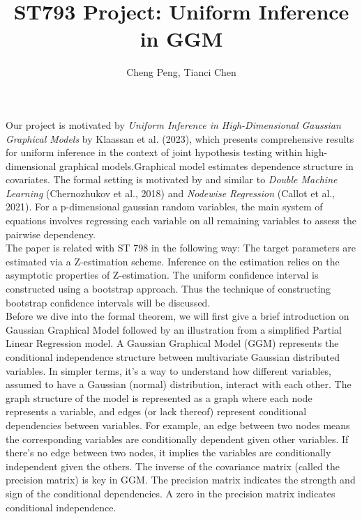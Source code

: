 \documentclass{article}
\author{Cheng Peng, Tianci Chen}
\title{ST793 Project: Uniform Inference in GGM}
\begin{document}
\maketitle

Our project is motivated by \textit{Uniform Inference in High-Dimensional Gaussian Graphical Models} by Klaassan et al. (2023), which presents comprehensive results for uniform inference in the context of joint hypothesis testing within high-dimensional graphical models.Graphical model estimates dependence structure in covariates. The formal setting is motivated by and similar to \textit{Double Machine Learning} (Chernozhukov et al., 2018) and \textit{Nodewise Regression} (Callot et al., 2021). For a p-dimensional gaussian random variables, the main system of equations involves regressing each variable on all remaining variables to assess the pairwise dependency. \\

\noindent The paper is related with ST 798 in the following way: The target parameters are estimated via a Z-estimation scheme. Inference on the estimation relies on the asymptotic properties of Z-estimation. The uniform confidence interval is constructed using a bootstrap approach. Thus the technique of constructing bootstrap confidence intervals will be discussed.\\

\noindent Before we dive into the formal theorem, we will first give a brief introduction on Gaussian Graphical Model followed by an illustration from a simplified Partial Linear Regression model. A Gaussian Graphical Model (GGM) represents the conditional independence structure between multivariate Gaussian distributed variables. In simpler terms, it's a way to understand how different variables, assumed to have a Gaussian (normal) distribution, interact with each other. The graph structure of the model is represented as a graph where each node represents a variable, and edges (or lack thereof) represent conditional dependencies between variables. For example, an edge between two nodes means the corresponding variables are conditionally dependent given other variables. If there's no edge between two nodes, it implies the variables are conditionally independent given the others. The inverse of the covariance matrix (called the precision matrix) is key in GGM. The precision matrix indicates the strength and sign of the conditional dependencies. A zero in the precision matrix indicates conditional independence.\\
\end{document}
